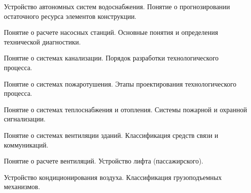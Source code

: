 \documentclass[
	14pt,
	a4paper,
	]
	{scrartcl}
\begin{document}
\shapk
{}
\setcounter{zad}{0}

\vfill
\z Устройство автономных систем водоснабжения.
 \vfill
\z Понятие о прогнозировании остаточного ресурса элементов конструкции.
 \vfill

\vfill

\newpage


\shapk
{}
\setcounter{zad}{0}

\vfill
\z Понятие о расчете насосных станций.
 \vfill
\z Основные понятия и определения технической диагностики.
 \vfill

\vfill

\newpage


\shapk
{}
\setcounter{zad}{0}

\vfill
\z Понятие о системах канализации.
 \vfill
\z Порядок разработки технологического процесса.
 \vfill

\vfill

\newpage


\shapk
{}
\setcounter{zad}{0}

\vfill
\z Понятие о системах пожаротушения.
 \vfill
\z Этапы проектирования технологического процесса.
 \vfill

\vfill

\newpage


\shapk
{}
\setcounter{zad}{0}

\vfill
\z Понятие о системах теплоснабжения и отопления.
 \vfill
\z Системы пожарной и охранной сигнализации.
 \vfill

\vfill

\newpage


\shapk
{}
\setcounter{zad}{0}

\vfill
\z Понятие о системах вентиляции зданий.
 \vfill
\z Классификация средств связи и коммуникаций.
 \vfill

\vfill

\newpage


\shapk
{}
\setcounter{zad}{0}

\vfill
\z Понятие о расчете вентиляций.
 \vfill
\z Устройство лифта (пассажирского).
 \vfill

\vfill

\newpage


\shapk
{}
\setcounter{zad}{0}

\vfill
\z Устройство кондиционирования воздуха.
 \vfill
\z Классификация грузоподъемных механизмов.
 \vfill

\vfill

\newpage
\end{document}
